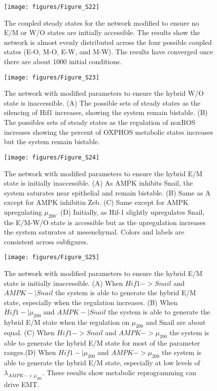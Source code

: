 \documentclass{article}
\begin{document}
\begin{figure}
\texttt{[image: figures/Figure\_S22]}
\caption{The coupled steady states for the network modified to ensure no E/M or W/O states are initially accessible. The results show the network is almost evenly distributed across the four possible coupled states (E-O, M-O, E-W, and M-W).  The results have converged once there are about 1000 initial conditions. }
\end{figure}

\begin{figure}
\texttt{[image: figures/Figure\_S23]}
\caption{The network with modified parameters to ensure the hybrid W/O state is inaccessible. (A) The possible sets of steady states as the silencing of Hif1 increases, showing the system remain bistable. (B) The possibles sets of  steady states as the regulation of noxROS increases showing the percent of OXPHOS metabolic states increases but the system remain bistable. }
\end{figure}
\begin{figure}
\texttt{[image: figures/Figure\_S24]}
\caption{The network with modified parameters to ensure the hybrid E/M state is initially inaccessible. (A) As AMPK inhibits Snail, the system saturates near epithelial and remain bistable. (B) Same as A except for AMPK inhibitin Zeb. (C)  Same except for AMPK upregulating $\mu_{200}$. (D) Initially, as Hif-1 slightly upregulates Snail, the E/M-W/O state is accessible but as the upregulation increases the system saturates at mesenchymal. Colors and labels are consistent across subfigures.}
\end{figure}

\begin{figure}
\texttt{[image: figures/Figure\_S25]}
\caption{The network with modified parameters to ensure the hybrid E/M state is initially inaccessible. (A) When $Hif1 -> Snail$ and $AMPK-| Snail$ the system is able to generate the hybrid E/M state, especially when the regulation increases. (B)  When $Hif1 -| \mu_{200}$ and $AMPK-| Snail$ the system is able to generate the hybrid E/M state when the regulation on $\mu_{200}$ and Snail are about equal. (C)  When $Hif1 -> Snail$ and $AMPK-> \mu_{200}$ the system is able to generate the hybrid E/M state for most of the parameter ranges.(D)  When $Hif1 -| \mu_{200}$ and $AMPK-> \mu_{200}$ the system is able to generate the hybrid E/M state, especially at low levels of $\lambda_{AMPK-> \mu_{200}}$. These results show metabolic reprogramming can drive EMT. }
\end{figure}
\end{document}
